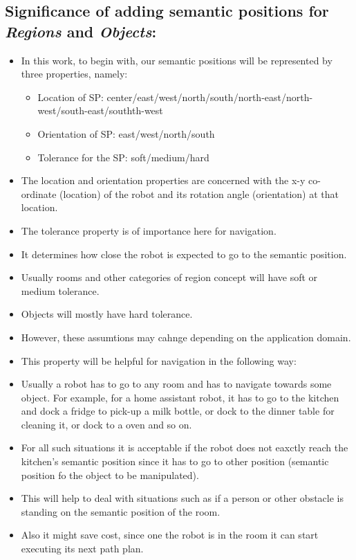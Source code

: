 \subsection{Significance of adding semantic positions for \textit{Regions} and \textit{Objects}:}
\begin{itemize}
  \item In this work, to begin with, our semantic positions will be represented by three properties, namely:
  \begin{itemize}
    \item Location of SP: center/east/west/north/south/north-east/north-west/south-east/southth-west
    \item Orientation of SP: east/west/north/south
    \item Tolerance for the SP: soft/medium/hard
  \end{itemize}
  \item The location and orientation properties are concerned with the x-y co-ordinate (location) of the robot and its rotation angle (orientation) at that location.
  \item The tolerance property is of importance here for navigation.
  \item It determines how close the robot is expected to go to the semantic position.
  \item Usually rooms and other categories of region concept will have soft or medium tolerance.
  \item Objects will mostly have hard tolerance.
  \item However, these assumtions may cahnge depending on the application domain.
  \item This property will be helpful for navigation in the following way:
  \item Usually a robot has to go to any room and has to navigate towards some object.
  For example, for a home assistant robot, it has to go to the kitchen and dock a fridge to pick-up a milk bottle, or dock to the dinner table for cleaning it, or dock to a oven and so on.
  \item For all such situations it is acceptable if the robot does not eaxctly reach the kitchen's semantic position since it has to go to other position (semantic position fo the object to be manipulated).
  \item This will help to deal with situations such as if a person or other obstacle is standing on the semantic position of the room.
  \item Also it might save cost, since one the robot is in the room it can start executing its next path plan. \\\\\\\\
      

\end{itemize}
